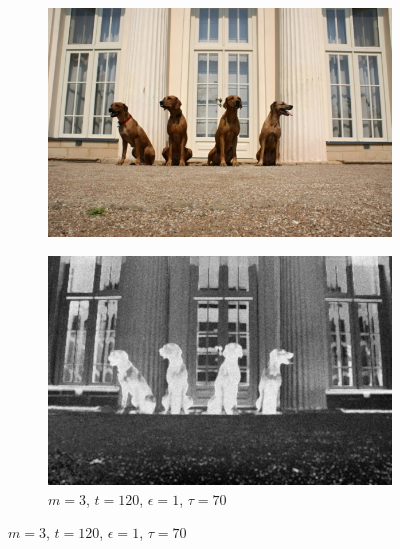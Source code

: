 \begin{figure}[H]
    \centering
    \begin{subfigure}{0.4\textwidth}
      \centering
      \includegraphics[scale=1.0]{obrazky/ORIGivos04.jpg}
      \caption{}
    \end{subfigure}
    \begin{subfigure}{0.4\textwidth}
      \centering
      \includegraphics[scale=1.0]{obrazky/StentifordSM-orig.jpg}
      \caption{$m=3$, $t=120$, $\epsilon=1$, $\tau=70$}
      \label{obr:salmapParamsB}
    \end{subfigure}
    \vspace{1pt}
    

\end{figure}
